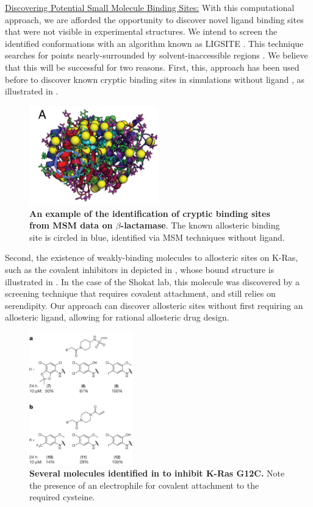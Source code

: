 \documentclass[12pt]{article}
\begin{document}
  \underline{Discovering Potential Small Molecule Binding Sites:} With this computational approach, we are afforded the opportunity to discover novel ligand binding sites that were not visible in experimental structures. We intend to screen the identified conformations with an algorithm known as LIGSITE \cite{hendlich1997}. This technique searches for points nearly-surrounded by solvent-inaccessible regions \cite{hendlich1997}. We believe that this will be successful for two reasons. First, this, approach has been used before to discover known cryptic binding sites in simulations without ligand \cite{bowman2012}, as illustrated in . 
  
  \begin{figure}[H]
  \centering
  \includegraphics[width=0.5\textwidth]{betalac_cryptic.png}
  \caption{\textbf{An example of the identification of cryptic binding sites from MSM data on $\beta$-lactamase}. The known allosteric binding site is circled in blue, identified via MSM techniques without ligand. \cite{bowman2012}}
  \label{bowmanbetalac}
  \end{figure}
  Second, the existence of weakly-binding molecules to allosteric sites on K-Ras, such as the covalent inhibitors in \cite{ostrem2013} depicted in , whose bound structure is illustrated in . In the case of the Shokat lab, this molecule was discovered by a screening technique that requires covalent attachment, and still relies on serendipity. Our approach can discover allosteric sites without first requiring an allosteric ligand, allowing for rational allosteric drug design. 
  \begin{figure}[H]
  \centering
  \includegraphics[width=0.4\textwidth]{shokat_mols.png}
  \caption{\textbf{Several molecules identified in \cite{ostrem2013} to inhibit K-Ras G12C.} Note the presence of an electrophile for covalent attachment to the required cysteine.}
  \label{shokat_mols}
  \end{figure}
  
\end{document}
